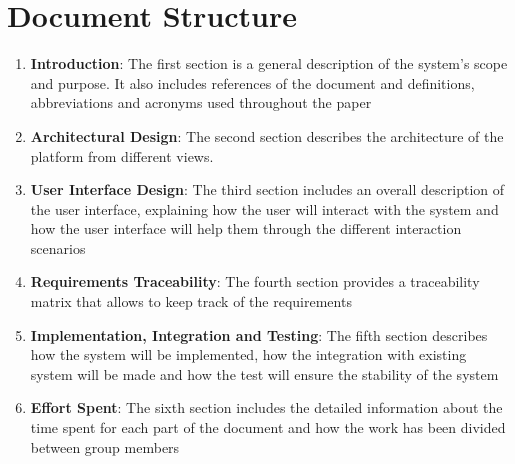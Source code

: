 \section{Document Structure}
\begin{enumerate}
  \item \textbf{Introduction}: The first section is a general description of the system's scope and purpose.
    It also includes references of the document and definitions, abbreviations and acronyms used throughout the paper
  \item \textbf{Architectural Design}: The second section describes the architecture of the platform from different views.
  \item \textbf{User Interface Design}: The third section includes an overall description of the user interface, explaining how the user will interact with the system and how the user interface will
    help them through the different interaction scenarios
  \item \textbf{Requirements Traceability}: The fourth section provides a traceability matrix that allows to keep track of the requirements
  \item \textbf{Implementation, Integration and Testing}: The fifth section describes how the system will be implemented, how the integration with existing system will be made and how the test will ensure the stability of the system
  \item \textbf{Effort Spent}: The sixth section includes the detailed information about the time spent for each part of the document and how the work has been divided between group members
\end{enumerate}